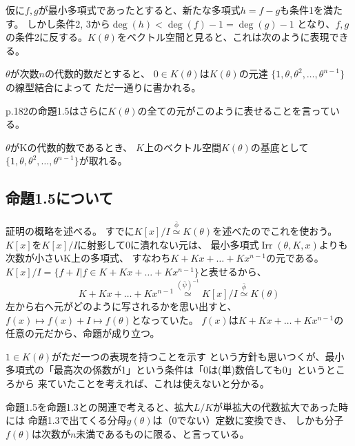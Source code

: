 \documentclass[a4j]{jarticle}
\begin{document}
        仮に$f,g$が最小多項式であったとすると、新たな多項式$h=f-g$も条件1を満たす。
        しかし条件2, 3から$\operatorname{deg}(h)<\operatorname{deg}(f)-1=\operatorname{deg}(g)-1$
        となり、$f,g$の条件2に反する。$K(\theta)$をベクトル空間と見ると、これは次のように表現できる。

        \begin{Prop}
            $\theta$が次数$n$の代数的数だとすると、
            $0 \in K(\theta)$は$K(\theta)$の元達
            $\{ 1, \theta, \theta^2, \dots, \theta^{n-1}\}$の線型結合によって
            ただ一通りに書かれる。
        \end{Prop}

        p.182の命題1.5はさらに$K(\theta)$の全ての元がこのように表せることを言っている。
        \begin{Prop}[命題1.5]
            $\theta$がKの代数的数であるとき、
            $K$上のベクトル空間$K(\theta)$の基底として
            $\{ 1, \theta, \theta^2, \dots, \theta^{n-1}\}$が取れる。
        \end{Prop}

    \subsection{命題1.5について}
        証明の概略を述べる。
        すでに$K[x]/I \overset{\bar{\phi}}{\simeq} K(\theta)$を述べたのでこれを使おう。
        $K[x]$を$K[x]/I$に射影して0に潰れない元は、
        最小多項式$\operatorname{Irr}(\theta, K, x)$よりも次数が小さいK上の多項式、
        すなわち$K+Kx+\dots+Kx^{n-1}$の元である。
        $K[x]/I=\{f+I | f \in K+Kx+\dots+Kx^{n-1} \}$と表せるから、
        \[ K+Kx+\dots+Kx^{n-1} \overset{(\bar{\psi})^{-1}}{\simeq} K[x]/I \overset{\bar{\phi}}{\simeq} K(\theta) \]
        左から右へ元がどのように写されるかを思い出すと、$f(x) \mapsto f(x)+I \mapsto f(\theta)$となっていた。
        $f(x)$は$K+Kx+\dots+Kx^{n-1}$の任意の元だから、命題が成り立つ。

        $1 \in K(\theta) $がただ一つの表現を持つことを示す
        という方針も思いつくが、最小多項式の「最高次の係数が1」という条件は「0は(単)数倍しても0」というところから
        来ていたことを考えれば、これは使えないと分かる。

        命題1.5を命題1.3との関連で考えると、拡大$L/K$が単拡大の代数拡大であった時には
        命題1.3で出てくる分母$g(\theta)$は（0でない）定数に変換でき、
        しかも分子$f(\theta)$は次数が$n$未満であるものに限る、と言っている。

\end{document}

